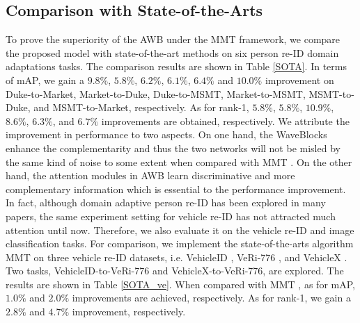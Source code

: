 \documentclass[journal]{IEEEtran}
\begin{document}
\subsection{Comparison with State-of-the-Arts}
To prove the superiority of the AWB under the MMT \cite{ge2020mutual} framework, we compare the proposed model with state-of-the-art methods on six person re-ID domain adaptations tasks. The comparison results are shown in Table \ref{SOTA}. In terms of mAP, we gain a $9.8\%$, $5.8\%$, $6.2\%$, $6.1\%$, $6.4\%$ and $10.0\%$ improvement on Duke-to-Market, Market-to-Duke, Duke-to-MSMT, Market-to-MSMT, MSMT-to-Duke, and MSMT-to-Market, respectively. As for rank-1, $5.8\%$, $5.8\%$, $10.9\%$, $8.6\%$, $6.3\%$, and $6.7\%$ improvements are obtained, respectively. We attribute the improvement in performance to two aspects. On one hand, the WaveBlocks enhance the complementarity and thus the two networks will not be misled by the same kind of noise to some extent when compared with MMT \cite{ge2020mutual}. On the other hand, the attention modules in AWB learn discriminative and more complementary information which is essential to the performance improvement. In fact, although domain adaptive person re-ID has been explored in many papers, the same experiment setting for vehicle re-ID has not attracted much attention until now. Therefore, we also evaluate it on the vehicle re-ID and image classification tasks. For comparison, we implement the state-of-the-arts algorithm MMT \cite{ge2020mutual} on three vehicle re-ID datasets, i.e. VehicleID \cite{liu_2016deep}, VeRi-776 \cite{liu2016deep}, and VehicleX \cite{naphade20204th}. Two tasks, VehicleID-to-VeRi-776 and VehicleX-to-VeRi-776, are explored. The results are shown in Table \ref{SOTA_ve}. When compared with MMT \cite{ge2020mutual}, as for mAP, $1.0\%$ and $2.0\%$ improvements are achieved, respectively. As for rank-1, we gain a $2.8\%$ and $4.7\%$ improvement, respectively. \par 
\end{document}
